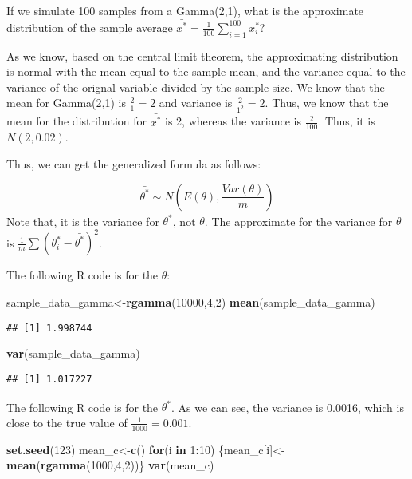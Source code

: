 \documentclass[]{book}
\newenvironment{Shaded}{\begin{snugshade}}{\end{snugshade}}
\newcommand{\KeywordTok}[1]{\textcolor[rgb]{0.13,0.29,0.53}{\textbf{#1}}}
\newcommand{\DecValTok}[1]{\textcolor[rgb]{0.00,0.00,0.81}{#1}}
\newcommand{\ControlFlowTok}[1]{\textcolor[rgb]{0.13,0.29,0.53}{\textbf{#1}}}
\newcommand{\OperatorTok}[1]{\textcolor[rgb]{0.81,0.36,0.00}{\textbf{#1}}}
\newcommand{\NormalTok}[1]{#1}
\begin{document}
If we simulate 100 samples from a Gamma(2,1), what is the approximate
distribution of the sample average
\(\bar{x^*}=\frac{1}{100} \sum_{i=1}^{100} x_i^*\)?

As we know, based on the central limit theorem, the approximating
distribution is normal with the mean equal to the sample mean, and the
variance equal to the variance of the orignal variable divided by the
sample size. We know that the mean for Gamma(2,1) is \(\frac{2}{1}=2\)
and variance is \(\frac{2}{1^2}=2\). Thus, we know that the mean for the
distribution for \(\bar{x^*}\) is 2, whereas the variance is
\(\frac{2}{100}\). Thus, it is \(N(2,0.02)\).

Thus, we can get the generalized formula as follows:

\[\bar{\theta^*} \sim N(E(\theta), \frac{Var(\theta)}{m})\] Note that,
it is the variance for \(\bar{\theta^*}\), not \(\theta\). The
approximate for the variance for \(\theta\) is
\(\frac{1}{m}\sum(\theta_i^*-\bar{\theta^*})^2\).

The following R code is for the \(\theta\):

\begin{Shaded}
\begin{Highlighting}[]
\NormalTok{sample_data_gamma<-}\KeywordTok{rgamma}\NormalTok{(}\DecValTok{10000}\NormalTok{,}\DecValTok{4}\NormalTok{,}\DecValTok{2}\NormalTok{)}
\KeywordTok{mean}\NormalTok{(sample_data_gamma)}
\end{Highlighting}
\end{Shaded}

\begin{verbatim}
## [1] 1.998744
\end{verbatim}

\begin{Shaded}
\begin{Highlighting}[]
\KeywordTok{var}\NormalTok{(sample_data_gamma)}
\end{Highlighting}
\end{Shaded}

\begin{verbatim}
## [1] 1.017227
\end{verbatim}

The following R code is for the \(\bar{\theta^*}\). As we can see, the
variance is 0.0016, which is close to the true value of
\(\frac{1}{1000}=0.001\).

\begin{Shaded}
\begin{Highlighting}[]
\KeywordTok{set.seed}\NormalTok{(}\DecValTok{123}\NormalTok{)}
\NormalTok{mean_c<-}\KeywordTok{c}\NormalTok{()}
\ControlFlowTok{for}\NormalTok{(i }\ControlFlowTok{in} \DecValTok{1}\OperatorTok{:}\DecValTok{10}\NormalTok{)}
\NormalTok{\{mean_c[i]<-}\KeywordTok{mean}\NormalTok{(}\KeywordTok{rgamma}\NormalTok{(}\DecValTok{1000}\NormalTok{,}\DecValTok{4}\NormalTok{,}\DecValTok{2}\NormalTok{))\}}
\KeywordTok{var}\NormalTok{(mean_c)}
\end{Highlighting}
\end{Shaded}
\end{document}
